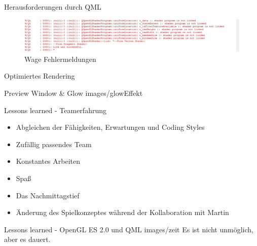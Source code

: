 \begin{frame}{Herausforderungen durch QML}
	\begin{figure}
		\centering
	\end{figure}
	\begin{figure}
		\centering
		\includegraphics[width=\textwidth, height=0.2\textheight, keepaspectratio]{images/linkerrorsuccess}
		\caption{Wage Fehlermeldungen}
	\end{figure}
\end{frame}

\begin{frame}{Optimiertes Rendering}

\end{frame}

\slidegraphic
{Preview Window \& Glow}
{images/glowEffekt}
{}

\begin{frame}{Lessons learned - Teamerfahrung}
	\begin{itemize}
		\item Abgleichen der Fähigkeiten, Erwartungen und Coding Styles
		\item Zufällig passendes Team
		\item Konstantes Arbeiten
		\item Spaß
	\end{itemize}
	\vfill
	\begin{itemize}
		\item Das Nachmittagstief
		\item Änderung des Spielkonzeptes während der Kollaboration mit Martin
	\end{itemize}
\end{frame}

\slidegraphic
{Lessons learned - OpenGL ES 2.0 und QML}
{images/zeit}
{Es ist nicht unmöglich, aber es dauert.}


%

